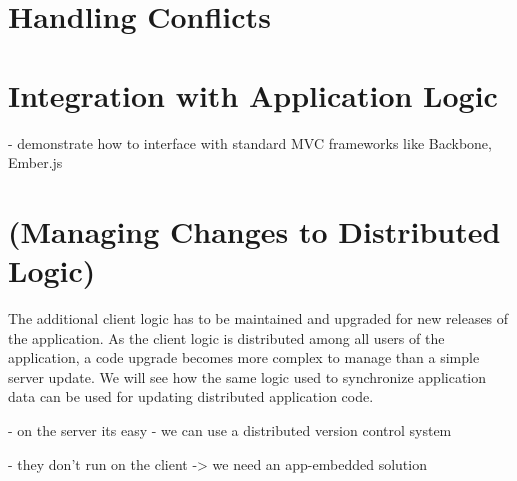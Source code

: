\section{Handling Conflicts}

\section{Integration with Application Logic}
- demonstrate how to interface with standard MVC frameworks like Backbone, Ember.js

\section{(Managing Changes to Distributed Logic)}
The additional client logic has to be maintained and upgraded for new releases of the application. As the client logic is distributed among all users of the application, a code upgrade becomes more complex to manage than a simple server update. We will see how the same logic used to synchronize application data can be used for updating distributed application code.

- on the server its easy - we can use a distributed version control system

- they don't run on the client -> we need an app-embedded solution

